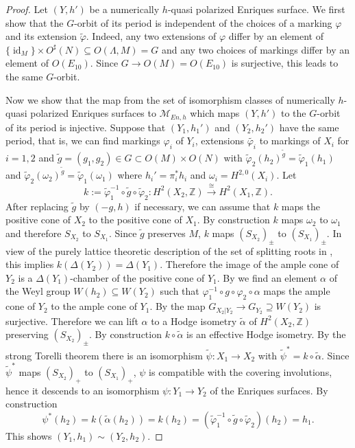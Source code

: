 \documentclass{amsart}
\theoremstyle{definition}
\theoremstyle{plain}
\DeclareMathOperator{\id}{id}
\newcommand{\ZZ}{\mathbb{Z}}
\newcommand{\M}{\mathcal{M}}
\begin{document}
\begin{proof}
    Let $(Y,h')$ be a numerically $h$-quasi polarized Enriques surface. We first show that the $G$-orbit of its period is independent of the choices of a marking $\varphi$ and its extension $\widetilde{\varphi}$. Indeed, any two extensions of $\varphi$ differ by an element of $\{\id_M\} \times O^\sharp(N) \subseteq O(\Lambda, M)=G$ and any two choices of markings differ by an element of $O(E_{10})$. Since $G \to O(M)=O(E_{10})$ is surjective, this leads to the same $G$-orbit.

    Now we show that the map from the set of isomorphism classes of numerically $h$-quasi polarized Enriques surfaces to $\M_{En,h}$ which maps $(Y,h')$ to the $G$-orbit of its period is injective.
    Suppose that $(Y_1,h_1')$ and $\left(Y_2,h_2'\right)$ have the same period, that is, we can find markings $\varphi_i$ of $Y_i$, extensions $\widetilde{\varphi_i}$ to markings of $X_i$
    for $i=1,2$ and $\widetilde{g}=(g_1,g_2) \in G\subset O(M)\times O(N)$ with $\widetilde{\varphi}_2(h_2)^{\widetilde{g}} = \widetilde{\varphi}_1(h_1)$ and $ \widetilde{\varphi}_2(\omega_2)^{\widetilde{g}} = \widetilde{\varphi}_1(\omega_1)$ where $h_i' = \pi_i^*h_i$ and $\omega_i=H^{2,0}(X_i)$.
   Let
    $$k:=\widetilde{\varphi}_1^{-1} \circ \widetilde{g}\circ \widetilde{\varphi}_2\colon H^2\left(X_2,\ZZ\right)\stackrel{\cong}{\to} H^2\left(X_1,\ZZ\right).$$
    After replacing $\tilde g$ by \((-g,h)\) if necessary, we can assume that $k$ maps the positive cone of $X_2$ to the positive cone of $X_1$. By construction $k$ maps $\omega_2$ to $\omega_1$ and therefore
    $S_{X_2}$ to $S_{X_1}$. Since $\widetilde{g}$ preserves $M$, $k$ maps $(S_{X_2})_\pm$ to $(S_{X_1})_\pm$. In view of the purely lattice theoretic description of the set of splitting roots in , this implies $k(\Delta(Y_2))=\Delta(Y_1)$. Therefore
    the image of the ample cone of $Y_2$ is a $\Delta(Y_1)$-chamber of the positive cone of $Y_1$.
    By  we find an
    element $\alpha$ of the Weyl group
    $W(h_2) \subseteq W(Y_2)$ such that
    $\varphi_1^{-1} \circ g \circ \varphi_2 \circ \alpha$ maps the ample cone of $Y_2$ to the ample cone of $Y_1$. By  the map $G_{X_2|Y_2} \to G_{Y_2} \supseteq W(Y_2)$ is surjective. Therefore we can lift $\alpha$ to a Hodge isometry $\tilde{\alpha}$ of $H^2(X_2,\ZZ)$ preserving $(S_{X_2})_{\pm}$.
    By construction $k\circ \tilde{\alpha}$ is an effective Hodge isometry. By the strong Torelli theorem there is an isomorphism $\widetilde{\psi}\colon X_1 \to X_2$ with $\widetilde{\psi}^* = k \circ \tilde{\alpha}$. Since $\widetilde{\psi}^*$ maps $\left(S_{X_2}\right)_+$ to $\left(S_{X_1}\right)_+$, $\psi$ is compatible with the covering involutions, hence it descends to an isomorphism $\psi \colon Y_1 \to Y_2$ of the Enriques surfaces. By construction
    $$\psi^*(h_2)=k\left(\tilde{\alpha}\left(h_2\right)\right)=k\left(h_2\right)=\left(\widetilde{\varphi}_1^{-1} \circ \widetilde{g}\circ \widetilde{\varphi}_2\right)\left(h_2\right)=h_1.$$
     This shows $\left(Y_1,h_1\right)\sim(Y_2,h_2)$.


\end{proof}
\end{document}
